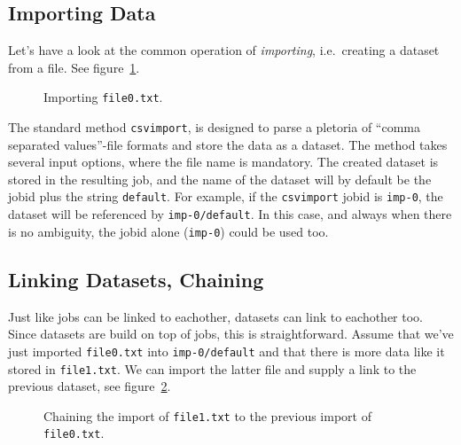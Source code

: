 \subsection{Importing Data}

Let's have a look at the common operation of \textsl{importing},
i.e.\ creating a dataset from a file.  See
figure~\ref{fig:dataset_csvimport}.

\begin{figure}[h!]
  \begin{center}
    
    \caption{Importing \texttt{file0.txt}.}
    \label{fig:dataset_csvimport}
  \end{center}
\end{figure}

\noindent The standard method \texttt{csvimport}, is designed to parse
a pletoria of ``comma separated values''-file formats and store the
data as a dataset.  The method takes several input options, where the
file name is mandatory.  The created dataset is stored in the
resulting job, and the name of the dataset will by default be the
jobid plus the string \texttt{default}.  For example, if the
\texttt{csvimport} jobid is \texttt{imp-0}, the dataset will be
referenced by \texttt{imp-0/default}.  In this case, and always when
there is no ambiguity, the jobid alone (\texttt{imp-0}) could be used
too.





\subsection{Linking Datasets, Chaining}

Just like jobs can be linked to eachother, datasets can link to
eachother too.  Since datasets are build on top of jobs, this is
straightforward.  Assume that we've just imported \texttt{file0.txt}
into \texttt{imp-0/default} and that there is more data like it stored
in \texttt{file1.txt}.  We can import the latter file and supply a
link to the previous dataset, see
figure~\ref{fig:dataset_csvimport_chain}.

\begin{figure}[h!]
  \begin{center}
    
    \caption{Chaining the import of \texttt{file1.txt} to the previous
      import of \texttt{file0.txt}.}
    \label{fig:dataset_csvimport_chain}
  \end{center}
\end{figure}

